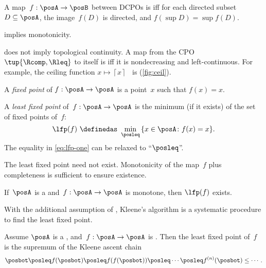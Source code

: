 \begin{definition}[\scottcontinuity]
  \label{def:scott}A map~$f:\posA\rightarrow\posB$ between DCPOs
  is\textbf{ }\emph{\scottcontinuous{}}\textbf{ }iff for each directed
  subset~$D\subseteq\posA$, the image~$f(D)$ is directed, and $f(\sup D)=\sup f(D).$
\end{definition}
\begin{remark}
  \scottcontinuity implies monotonicity.
\end{remark}

\begin{remark}
  \scottcontinuity does not imply topological continuity. A map from
  the CPO $\tup{\Rcomp,\Rleq}$ to itself is \scottcontinuous
  iff it is nondecreasing and left-continuous. For example, the ceiling
  function $x\mapsto\left\lceil x\right\rceil $~ is \scottcontinuous
  (\cref{fig:ceil}).
\end{remark}

\emph{}

A \emph{fixed point} of $f:\posA\to\posA$ is a point~$x$
such that $f(x)=x$.
\begin{definition}
  A \emph{least fixed point} of~$f:\posA\to\posA$ is the minimum
  (if it exists) of the set of fixed points of~$f$:
  \begin{equation}
    \lfp(f)\,\,\definedas\,\,\min_{\posleq}\,\{x\in\posA\colon f(x)=x\}.\label{eq:lfp-one}
  \end{equation}
  The equality in \cref{eq:lfp-one} can be relaxed to ``$\posleq$''.
\end{definition}
The least fixed point need not exist. Monotonicity of the map~$f$
plus completeness is sufficient to ensure existence.
\begin{lemma}
  \label{lem:CPO-fix-point-2}If~$\posA$ is a \CPO and~$f:\posA\rightarrow\posA$
  is monotone, then $\lfp(f)$ exists.
\end{lemma}


With the additional assumption of \scottcontinuity, Kleene's algorithm
is a systematic procedure to find the least fixed point.
\begin{lemma}
  \label{lem:kleene-1}Assume $\posA$ is a \CPO, and~$f:\posA\rightarrow\posA$
  is \scottcontinuous. Then the least fixed point of~$f$ is the supremum
  of the Kleene ascent chain
  \[
    \posbot\posleq f(\posbot)\posleq f(f(\posbot))\posleq\cdots\posleq f^{(n)}(\posbot)\leq\cdots.
  \]
\end{lemma}
